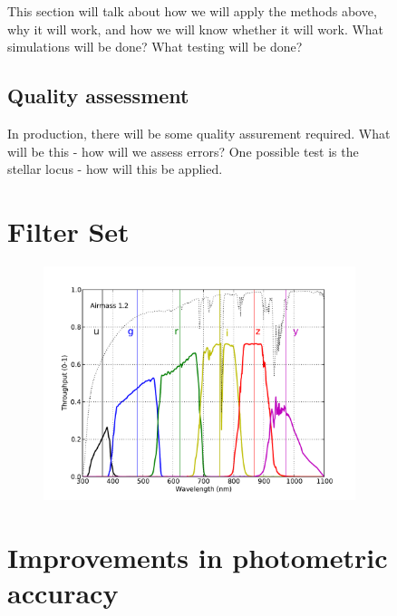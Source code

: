\documentclass[12pt,preprint]{aastex}
\begin{document}
\begin{figure}[htbp]
{This section will talk about how we will apply the methods above, why
it will work, and how we will know whether it will work. What
simulations will be done? What testing
will be done? 


\subsection{Quality assessment}
In production, there will be some quality assurement required. What
will be this - how will we assess errors? 
One possible test is the stellar locus - how will this be applied.


\appendix





\section{Filter Set}

\begin{figure}[ht]
\includegraphics[width=5in]{filters}
\end{figure}


\section{Improvements in photometric accuracy}

}
\end{figure}
\end{document}
